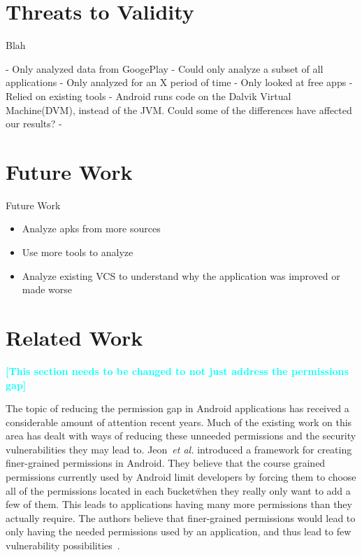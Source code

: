 \documentclass{sig-alternate}
\newcommand{\todo}[1]{\textcolor{cyan}{\textbf{[#1]}}}
\begin{document}
\section{Threats to Validity}

 Blah


- Only analyzed data from GoogePlay
- Could only analyze a subset of all applications
- Only analyzed for an X period of time
- Only looked at free apps
- Relied on existing tools
- Android runs code on the Dalvik Virtual Machine(DVM)\cite{Mirzaei:2012:TAA:2382756.2382798}, instead of the JVM. Could some of the differences have affected our results?
-



\section{Future Work}
\label{sec: futurework}
Future Work


\begin{itemize}
  \item Analyze apks from more sources
  \item Use more tools to analyze
  \item  Analyze existing VCS to understand why the application was improved or made worse
\end{itemize}




\section{Related Work}
\label{sec: relatedwork}

\todo{This section needs to be changed to not just address the permissions gap}

The topic of reducing the permission gap in Android applications has received a considerable amount of attention recent years. Much of the existing work on this area has dealt with ways of reducing these unneeded permissions and the security vulnerabilities they may lead to. Jeon~\emph{et al.} introduced a framework for creating finer-grained permissions in Android. They believe that the course grained permissions currently used by Android limit developers by forcing them to choose all of the permissions located in each \"bucket\" when they really only want to add a few of them. This leads to applications having many more permissions than they actually require. The authors believe that finer-grained permissions would lead to only having the needed permissions used by an application, and thus lead to few vulnerability possibilities~\cite{jeon2011dr}.
\end{document}
